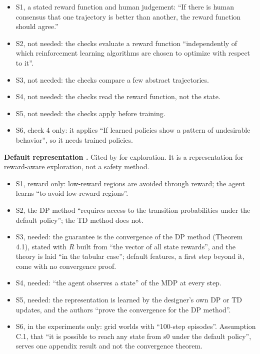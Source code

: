 \documentclass{article}
\providecommand{\tightlist}{\setlength{\itemsep}{0pt}\setlength{\parskip}{0pt}}
\begin{document}
\begin{itemize}
\tightlist
\item
  S1, a stated reward function and human judgement: ``If there is human consensus that one trajectory is better than another, the reward function should agree.''
\item
  S2, not needed: the checks evaluate a reward function ``independently of which reinforcement learning algorithms are chosen to optimize with respect to it''.
\item
  S3, not needed: the checks compare a few abstract trajectories.
\item
  S4, not needed: the checks read the reward function, not the state.
\item
  S5, not needed: the checks apply before training.
\item
  S6, check 4 only: it applies ``If learned policies show a pattern of undesirable behavior'', so it needs trained policies.
\end{itemize}

\textbf{Default representation \citep{tse2025}.} Cited by \citet{mclean2026} for exploration. It is a representation for reward-aware exploration, not a safety method.

\begin{itemize}
\tightlist
\item
  S1, reward only: low-reward regions are avoided through reward; the agent learns ``to avoid low-reward regions''.
\item
  S2, the DP method ``requires access to the transition probabilities under the default policy''; the TD method does not.
\item
  S3, needed: the guarantee is the convergence of the DP method (Theorem 4.1), stated with \(R\) built from ``the vector of all state rewards'', and the theory is laid ``in the tabular case''; default features, a first step beyond it, come with no convergence proof.
\item
  S4, needed: ``the agent observes a state'' of the MDP at every step.
\item
  S5, needed: the representation is learned by the designer's own DP or TD updates, and the authors ``prove the convergence for the DP method''.
\item
  S6, in the experiments only: grid worlds with ``100-step episodes''. Assumption C.1, that ``it is possible to reach any state from s0 under the default policy'', serves one appendix result and not the convergence theorem.
\end{itemize}
\end{document}
